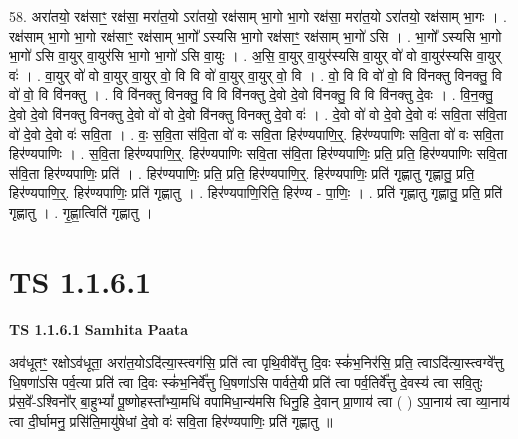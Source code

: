\documentclass[17pt]{extarticle}
\begin{document}
58. अरा॑तयो॒ रक्ष॑साꣳ॒॒ रक्ष॑सा॒ मरा॑त॒यो ऽरा॑तयो॒ रक्ष॑साम् भा॒गो भा॒गो रक्ष॑सा॒ मरा॑त॒यो ऽरा॑तयो॒ रक्ष॑साम् भा॒गः । . रक्ष॑साम् भा॒गो भा॒गो रक्ष॑साꣳ॒॒ रक्ष॑साम् भा॒गो᳚ ऽस्यसि भा॒गो रक्ष॑साꣳ॒॒ रक्ष॑साम् भा॒गो॑ ऽसि । . भा॒गो᳚ ऽस्यसि भा॒गो भा॒गो॑ ऽसि वा॒युर् वा॒युर॑सि भा॒गो भा॒गो॑ ऽसि वा॒युः । . अ॒सि॒ वा॒युर् वा॒युर॑स्यसि वा॒युर् वो॑ वो वा॒युर॑स्यसि वा॒युर् वः॑ । . वा॒युर् वो॑ वो वा॒युर् वा॒युर् वो॒ वि वि वो॑ वा॒युर् वा॒युर् वो॒ वि । . वो॒ वि वि वो॑ वो॒ वि वि॑नक्तु विनक्तु॒ वि वो॑ वो॒ वि वि॑नक्तु । . वि वि॑नक्तु विनक्तु॒ वि वि वि॑नक्तु दे॒वो दे॒वो वि॑नक्तु॒ वि वि वि॑नक्तु दे॒वः । . वि॒न॒क्तु॒ दे॒वो दे॒वो वि॑नक्तु विनक्तु दे॒वो वो॑ वो दे॒वो वि॑नक्तु विनक्तु दे॒वो वः॑ । . दे॒वो वो॑ वो दे॒वो दे॒वो वः॑ सवि॒ता स॑वि॒ता वो॑ दे॒वो दे॒वो वः॑ सवि॒ता । . वः॒ स॒वि॒ता स॑वि॒ता वो॑ वः सवि॒ता हिर॑ण्यपाणि॒र्॒. हिर॑ण्यपाणिः सवि॒ता वो॑ वः सवि॒ता हिर॑ण्यपाणिः । . स॒वि॒ता हिर॑ण्यपाणि॒र्॒. हिर॑ण्यपाणिः सवि॒ता स॑वि॒ता हिर॑ण्यपाणिः॒ प्रति॒ प्रति॒ हिर॑ण्यपाणिः सवि॒ता स॑वि॒ता हिर॑ण्यपाणिः॒ प्रति॑ । . हिर॑ण्यपाणिः॒ प्रति॒ प्रति॒ हिर॑ण्यपाणि॒र्॒. हिर॑ण्यपाणिः॒ प्रति॑ गृह्णातु गृह्णातु॒ प्रति॒ हिर॑ण्यपाणि॒र्॒. हिर॑ण्यपाणिः॒ प्रति॑ गृह्णातु । . हिर॑ण्यपाणि॒रिति॒ हिर॑ण्य - पा॒णिः॒ । . प्रति॑ गृह्णातु गृह्णातु॒ प्रति॒ प्रति॑ गृह्णातु । . गृ॒ह्णा॒त्विति॑ गृह्णातु । \newline
\pagebreak
{}

\section{ TS 1.1.6.1 }

\textbf{TS 1.1.6.1 } \newline
\textbf{Samhita Paata} \newline

अव॑धूतꣳ॒॒ रक्षोऽव॑धूता॒ अरा॑त॒योऽदि॑त्या॒स्त्वग॑सि॒ प्रति॑ त्वा पृथि॒वीवे᳚त्तु दि॒वः स्कं॑भ॒निर॑सि॒ प्रति॒ त्वाऽदि॑त्या॒स्त्वग्वे᳚त्तु धि॒षणा॑ऽसि पर्व॒त्या प्रति॑ त्वा दि॒वः स्कं॑भ॒निर्वे᳚त्तु धि॒षणा॑ऽसि पार्वते॒यी प्रति॑ त्वा पर्व॒तिर्वे᳚त्तु दे॒वस्य॑ त्वा सवि॒तुः प्र॑स॒वे᳚-ऽश्विनो᳚र् बा॒हुभ्यां᳚ पू॒ष्णोहस्ता᳚भ्या॒मधि॑ वपामिधा॒न्य॑मसि धिनु॒हि दे॒वान् प्रा॒णाय॑ त्वा ( ) ऽपा॒नाय॑ त्वा व्या॒नाय॑ त्वा दी॒र्घामनु॒ प्रसि॑ति॒मायु॑षेधां दे॒वो वः॑ सवि॒ता हिर॑ण्यपाणिः॒ प्रति॑ गृह्णातु ॥ \newline
\end{document}
